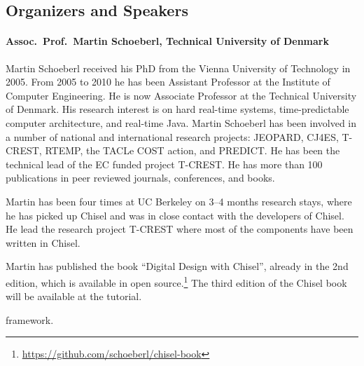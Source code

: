\documentclass{article}
\begin{document}
\subsection*{Organizers and Speakers}

 
\paragraph{Assoc.~Prof.~Martin Schoeberl, Technical University of Denmark}

Martin Schoeberl received his PhD from the Vienna University of Technology in 2005. From 2005 to 2010 he has been Assistant Professor at the Institute of Computer Engineering. He is now Associate Professor at the Technical University of Denmark. His research interest is on hard real-time systems, time-predictable computer architecture, and real-time Java.  Martin Schoeberl has been involved in a number of national and international research projects: JEOPARD, CJ4ES, T-CREST, RTEMP, the TACLe COST action, and PREDICT.  He has been the technical lead of the EC funded project T-CREST.  He has more than 100 publications in peer reviewed journals, conferences, and books.

Martin has been four times at UC Berkeley on 3--4 months research stays, where he has picked up Chisel and was in close contact with the developers of Chisel. He lead the research project T-CREST where most of the components have been written in Chisel.

Martin has published the book ``Digital Design with Chisel'', already in the 2nd edition,
which is available in open source.\footnote{\url{https://github.com/schoeberl/chisel-book}}
The third edition of the Chisel book will be available at the tutorial.

%
%
framework.
\end{document}

